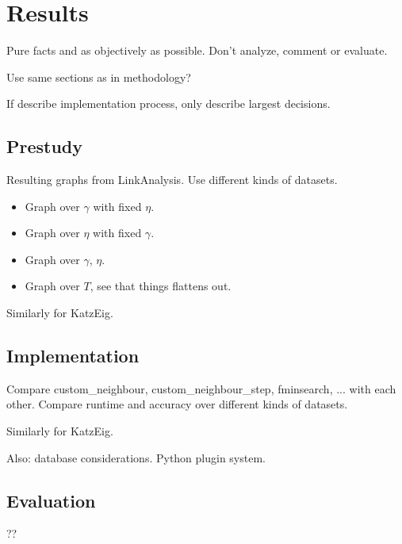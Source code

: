 \chapter{Results}\label{cha:Results}

Pure facts and as objectively as possible. Don't analyze, comment or evaluate.

Use same sections as in methodology?

If describe implementation process, only describe largest decisions.

\section{Prestudy}\label{sec:prestudy}

Resulting graphs from LinkAnalysis. Use different kinds of datasets.

\begin{itemize}
    \item Graph over $\gamma$ with fixed $\eta$.
    \item Graph over $\eta$ with fixed $\gamma$.
    \item Graph over $\gamma$, $\eta$.
    \item Graph over $T$, see that things flattens out.
\end{itemize}

Similarly for KatzEig.

\section{Implementation}\label{sec:implementation}

Compare custom\_neighbour, custom\_neighbour\_step, fminsearch, ... with each other. Compare runtime and accuracy over different kinds of datasets.

Similarly for KatzEig.

Also: database considerations. Python plugin system.

\section{Evaluation}\label{sec:evaluation}

??

%
%
%
